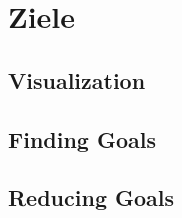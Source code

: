 \section{Ziele}

\subsection{Visualization}

\subsection{Finding Goals}

\subsection{Reducing Goals}



